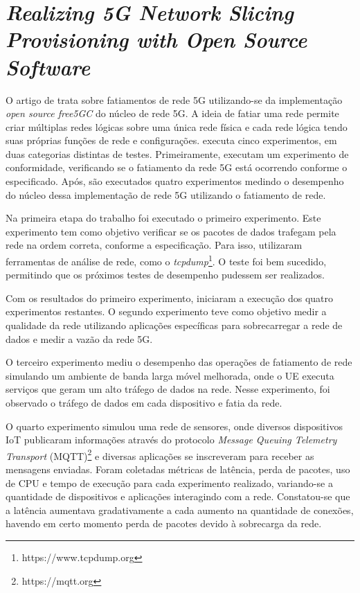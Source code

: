 \section{\textit{Realizing 5G Network Slicing Provisioning with Open Source Software}}

O artigo de  trata sobre fatiamentos de rede 5G utilizando-se da implementação \textit{open source free5GC} do núcleo de rede 5G.
A ideia de fatiar uma rede permite criar múltiplas redes lógicas sobre uma única rede física e cada rede lógica tendo suas próprias funções de rede e configurações.
 executa cinco experimentos, em duas categorias distintas de testes. Primeiramente, executam um experimento de conformidade, verificando se o fatiamento da rede 5G está ocorrendo conforme o especificado. Após, são executados quatro experimentos medindo o desempenho do núcleo dessa implementação de rede 5G utilizando o fatiamento de rede.

Na primeira etapa do trabalho foi executado o primeiro experimento.
Este experimento tem como objetivo verificar se os pacotes de dados trafegam pela rede na ordem correta, conforme a especificação.
Para isso, utilizaram ferramentas de análise de rede, como o \textit{tcpdump}\footnote{https://www.tcpdump.org}.
O teste foi bem sucedido, permitindo que os próximos testes de desempenho pudessem ser realizados.

Com os resultados do primeiro experimento,  iniciaram a execução dos quatro experimentos restantes.
O segundo experimento teve como objetivo medir a qualidade da rede utilizando aplicações específicas para sobrecarregar a rede de dados e medir a vazão da rede 5G.

O terceiro experimento mediu o desempenho das operações de fatiamento de rede simulando um ambiente de banda larga móvel melhorada, onde o UE executa serviços que geram um alto tráfego de dados na rede.
Nesse experimento, foi observado o tráfego de dados em cada dispositivo e fatia da rede.

O quarto experimento simulou uma rede de sensores, onde diversos dispositivos IoT publicaram informações através do protocolo \textit{Message Queuing Telemetry Transport} (MQTT)\footnote{https://mqtt.org} e diversas aplicações se inscreveram para receber as mensagens enviadas.
Foram coletadas métricas de latência, perda de pacotes, uso de CPU e tempo de execução para cada experimento realizado, variando-se a quantidade de dispositivos e aplicações interagindo com a rede.
Constatou-se que a latência aumentava gradativamente a cada aumento na quantidade de conexões, havendo em certo momento perda de pacotes devido à sobrecarga da rede.

